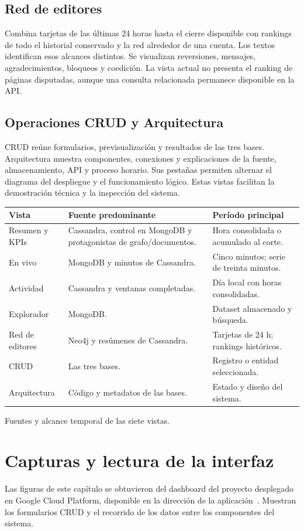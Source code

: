 \subsection{Red de editores}
Combina tarjetas de las últimas 24 horas hasta el cierre disponible con rankings de todo el historial conservado y la red alrededor de una cuenta. Los textos identifican esos alcances distintos. Se visualizan reversiones, mensajes, agradecimientos, bloqueos y coedición. La vista actual no presenta el ranking de páginas disputadas, aunque una consulta relacionada permanece disponible en la API.

\subsection{Operaciones CRUD y Arquitectura}
CRUD reúne formularios, previsualización y resultados de las tres bases. Arquitectura muestra componentes, conexiones y explicaciones de la fuente, almacenamiento, API y proceso horario. Sus pestañas permiten alternar el diagrama del despliegue y el funcionamiento lógico. Estas vistas facilitan la demostración técnica y la inspección del sistema.

\begin{tabla}
\begin{tabularx}{\textwidth}{P{3.5cm}P{3.7cm}Y}
\toprule
Vista & Fuente predominante & Período principal \\
\midrule
Resumen y KPIs & Cassandra, control en MongoDB y protagonistas de grafo/documentos. & Hora consolidada o acumulado al corte. \\
En vivo & MongoDB y minutos de Cassandra. & Cinco minutos; serie de treinta minutos. \\
Actividad & Cassandra y ventanas completadas. & Día local con horas consolidadas. \\
Explorador & MongoDB. & Dataset almacenado y búsqueda. \\
Red de editores & Neo4j y resúmenes de Cassandra. & Tarjetas de 24 h; rankings históricos. \\
CRUD & Las tres bases. & Registro o entidad seleccionada. \\
Arquitectura & Código y metadatos de las bases. & Estado y diseño del sistema. \\
\bottomrule
\end{tabularx}
\caption{Fuentes y alcance temporal de las siete vistas.}
\end{tabla}

\Needspace{18cm}
\section{Capturas y lectura de la interfaz}
Las figuras de este capítulo se obtuvieron del dashboard del proyecto desplegado en Google Cloud Platform, disponible en la dirección de la aplicación~\cite{dashboard}. Muestran los formularios CRUD y el recorrido de los datos entre los componentes del sistema.

